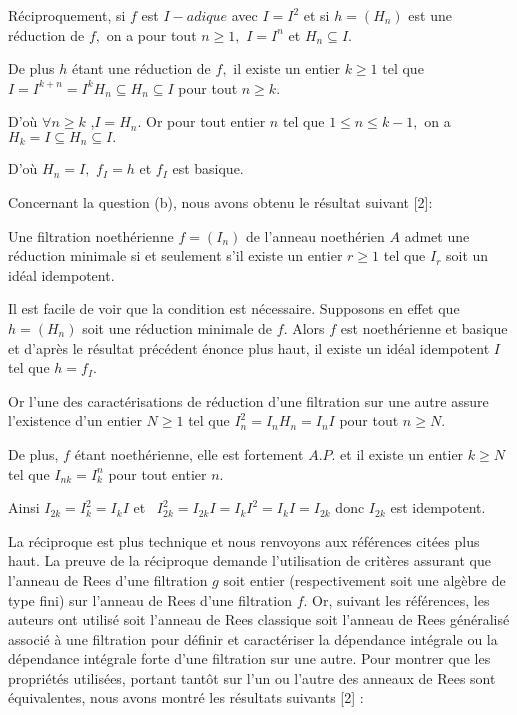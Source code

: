 \documentclass[11pt, twoside]{article}
\begin{document}
Réciproquement, si $f$ est $I-adique$ avec $I=I^{2}$ et si $h=(H_{n})$
est une réduction de $f,$ on a pour tout $n\geq 1,$ $I=I^{n}$ et $%
H_{n}\subseteq I.$

De plus $h$ étant une réduction de $f,$ il existe un entier $k\geq 1$
tel que $I=I^{k+n}=I^{k}H_{n}\subseteq H_{n}\subseteq I$ pour tout $n\geq k.$

D'où $\forall n\geq k$ ,$I=H_{n}.$ Or pour tout entier $n$ tel que $1\leq n\leq k-1,$ on a $H_{k}=I\subseteq H_{n}\subseteq I.$

D'où $H_{n}=I,$ $f_{I}=h$ et $f_{I}$ est basique.

Concernant la question (b), nous avons obtenu le résultat suivant [2]:

Une filtration noethérienne $f=(I_{n})$ de l'anneau noethérien $A$
admet une réduction minimale si et seulement s'il existe un entier $r\geq 1$ tel que $I_{r}$ soit un idéal idempotent.

Il est facile de voir que la condition est nécessaire. Supposons en
effet que $h=(H_{n})$ soit une réduction minimale de $f$. Alors $f $
est noethérienne et basique et d'après le résultat précédent énonce plus haut, il existe un idéal idempotent $I$ tel que $h=f_{I}$. 

Or l'une des caractérisations de réduction d'une filtration sur une
autre assure l'existence d'un entier $N\geq 1$ tel que $I_{n}^{2}=I_{n}H_{n}=I_{n}I$ pour tout $n\geq N$. 

De plus, $f$ étant noethérienne, elle est fortement $A.P.$ et il
existe un entier $k\geq N$ tel que $I_{nk}=I_{k}^{n}$ pour tout entier $n$. 

Ainsi $I_{2k}=I_{k}^{2}=I_{k}I$ et \ $I_{2k}^{2}=I_{2k}I=I_{k}I^{2}=I_{k}I=I_{2k}$ donc $I_{2k}$ est idempotent.

La réciproque est plus technique et nous renvoyons aux références citées plus haut. La preuve de la réciproque demande
l'utilisation de critères assurant que l'anneau de Rees d'une filtration 
$g$ soit entier (respectivement soit une algèbre de type fini) sur l'anneau de
Rees d'une filtration $f.$ Or, suivant les références, les auteurs
ont utilisé soit l'anneau de Rees classique soit l'anneau de Rees généralisé associé à une filtration pour définir et caractériser la dépendance intégrale ou la dépendance intégrale forte d'une filtration sur une autre. Pour montrer que les propriétés utilisées, portant tant\^{o}t sur l'un ou l'autre des anneaux de
Rees sont équivalentes, nous avons montré les résultats suivants
[2] :
\end{document}
